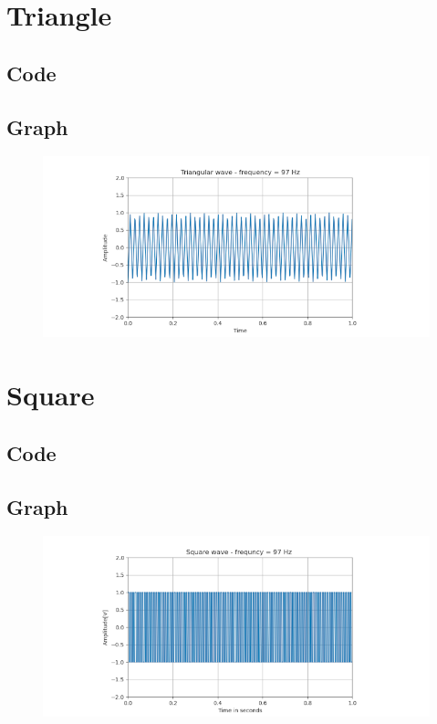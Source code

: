 \documentclass[11pt,a4paper]{article}
\begin{document}
\section{Triangle} %
	\subsection{Code} %
	        
	\subsection{Graph}%
	     \begin{figure}[hb]
	          \includegraphics{Triangle.png}
	      \end{figure} 
	      \newpage
\section{Square} %
	\subsection{Code} %
	        
	\subsection{Graph}%
	     \begin{figure}[hb]
	          \includegraphics{square.png}
	      \end{figure}
	      \newpage
\end{document}
